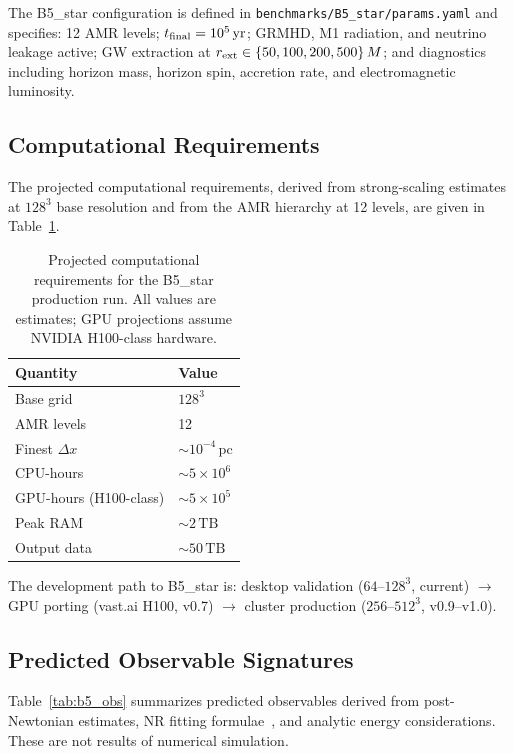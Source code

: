 \documentclass[aps,prd,twocolumn,superscriptaddress,nofootinbib,showpacs,
               longbibliography]{revtex4-2}
\newcommand{\code}[1]{\texttt{#1}}
\begin{document}
The B5\_star configuration is defined in
\code{benchmarks/B5\_star/params.yaml} and specifies:
12 AMR levels; $t_{\rm final} = 10^5\,\text{yr}$; GRMHD, M1 radiation,
and neutrino leakage active; GW extraction at
$r_{\rm ext} \in \{50, 100, 200, 500\}\,M$; and diagnostics including
horizon mass, horizon spin, accretion rate, and electromagnetic luminosity.

\subsection{Computational Requirements}
\label{sec:b5_compute}

The projected computational requirements, derived from strong-scaling
estimates at $128^3$ base resolution and from the AMR hierarchy at 12 levels,
are given in Table~\ref{tab:b5_compute}.

\begin{table}[t]
\caption{Projected computational requirements for the B5\_star production run.
  All values are estimates; GPU projections assume NVIDIA H100-class hardware.}
\label{tab:b5_compute}
\begin{ruledtabular}
\begin{tabular}{ll}
  Quantity & Value \\ \hline
  Base grid & $128^3$ \\
  AMR levels & 12 \\
  Finest $\Delta x$ & ${\sim}10^{-4}\,\text{pc}$ \\
  CPU-hours & ${\sim}5\times10^6$ \\
  GPU-hours (H100-class) & ${\sim}5\times10^5$ \\
  Peak RAM & ${\sim}2\,\text{TB}$ \\
  Output data & ${\sim}50\,\text{TB}$ \\
\end{tabular}
\end{ruledtabular}
\end{table}

The development path to B5\_star is:
desktop validation ($64$--$128^3$, current)
$\to$ GPU porting (vast.ai H100, v0.7)
$\to$ cluster production ($256$--$512^3$, v0.9--v1.0).

\subsection{Predicted Observable Signatures}
\label{sec:b5_observables}

Table~\ref{tab:b5_obs} summarizes predicted observables derived from
post-Newtonian estimates, NR fitting formulae~\cite{Healy2014}, and
analytic energy considerations.
These are not results of numerical simulation.
\end{document}
